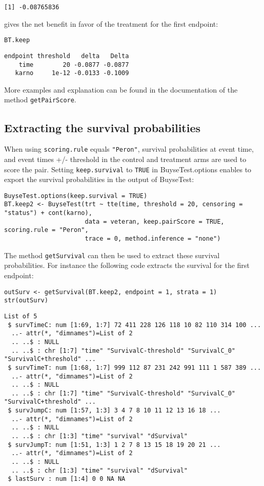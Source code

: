 \documentclass[12pt]{article}
\begin{document}
\begin{verbatim}
[1] -0.08765836
\end{verbatim}

gives the net benefit in favor of the treatment for the first
endpoint:
\lstset{language=r,label= ,caption= ,captionpos=b,numbers=none}
\begin{lstlisting}
BT.keep
\end{lstlisting}

\begin{verbatim}
endpoint threshold   delta   Delta
    time        20 -0.0877 -0.0877
   karno     1e-12 -0.0133 -0.1009
\end{verbatim}

More examples and explanation can be found in the documentation of
the method \texttt{getPairScore}.

\subsection{Extracting the survival probabilities}
\label{sec:org3911780}
When using \texttt{scoring.rule} equals \texttt{"Peron"}, survival probabilities at
event time, and event times +/- threshold in the control and treatment
arms are used to score the pair. Setting \texttt{keep.survival} to \texttt{TRUE} in
BuyseTest.options enables to export the survival probabilities in the
output of BuyseTest:
\lstset{language=r,label= ,caption= ,captionpos=b,numbers=none}
\begin{lstlisting}
BuyseTest.options(keep.survival = TRUE)
BT.keep2 <- BuyseTest(trt ~ tte(time, threshold = 20, censoring = "status") + cont(karno),
					  data = veteran, keep.pairScore = TRUE, scoring.rule = "Peron",
					  trace = 0, method.inference = "none")
\end{lstlisting}

The method \texttt{getSurvival} can then be used to extract these survival
probabilities. For instance the following code extracts the survival
for the first endpoint:
\lstset{language=r,label= ,caption= ,captionpos=b,numbers=none}
\begin{lstlisting}
outSurv <- getSurvival(BT.keep2, endpoint = 1, strata = 1)
str(outSurv)
\end{lstlisting}

\begin{verbatim}
List of 5
 $ survTimeC: num [1:69, 1:7] 72 411 228 126 118 10 82 110 314 100 ...
  ..- attr(*, "dimnames")=List of 2
  .. ..$ : NULL
  .. ..$ : chr [1:7] "time" "SurvivalC-threshold" "SurvivalC_0" "SurvivalC+threshold" ...
 $ survTimeT: num [1:68, 1:7] 999 112 87 231 242 991 111 1 587 389 ...
  ..- attr(*, "dimnames")=List of 2
  .. ..$ : NULL
  .. ..$ : chr [1:7] "time" "SurvivalC-threshold" "SurvivalC_0" "SurvivalC+threshold" ...
 $ survJumpC: num [1:57, 1:3] 3 4 7 8 10 11 12 13 16 18 ...
  ..- attr(*, "dimnames")=List of 2
  .. ..$ : NULL
  .. ..$ : chr [1:3] "time" "survival" "dSurvival"
 $ survJumpT: num [1:51, 1:3] 1 2 7 8 13 15 18 19 20 21 ...
  ..- attr(*, "dimnames")=List of 2
  .. ..$ : NULL
  .. ..$ : chr [1:3] "time" "survival" "dSurvival"
 $ lastSurv : num [1:4] 0 0 NA NA
\end{verbatim}
\end{document}
